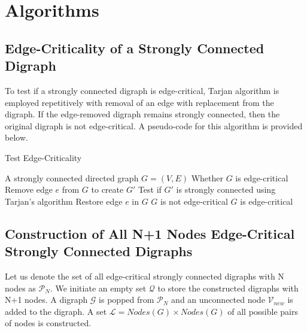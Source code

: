 \documentclass[runningheads]{llncs}
\begin{document}
\section{Algorithms}

\subsection{Edge-Criticality of a Strongly Connected Digraph}
 To test if a strongly connected digraph is edge-critical, Tarjan algorithm is employed repetitively with removal of an edge with replacement from the digraph. If the edge-removed digraph remains strongly connected, then the original digraph is not edge-critical. A pseudo-code for this algorithm is provided below.

\begin{algorithm}
\caption{Test Edge-Criticality}
\label{alg:edge_criticality}
\begin{algorithmic}[1]
\REQUIRE A strongly connected directed graph $G = (V, E)$
\ENSURE Whether $G$ is edge-critical
    \STATE Remove edge $e$ from $G$ to create $G'$
    \STATE Test if $G'$ is strongly connected using Tarjan's algorithm
        \STATE Restore edge $e$ in $G$
    \ELSE
        \RETURN $G$ is not edge-critical
    \ENDIF
\ENDFOR
\RETURN $G$ is edge-critical
\end{algorithmic}
\end{algorithm}

\subsection{Construction of All N+1 Nodes Edge-Critical Strongly Connected Digraphs}
Let us denote the set of all edge-critical strongly connected digraphs with N nodes as $\mathcal{P}_N$. We initiate an empty set $\mathcal{Q}$ to store the constructed digraphs with N+1 nodes. A digraph $\mathcal{G}$ is popped from $\mathcal{P}_N$ and an unconnected node $\mathcal{V}_{new}$ is added to the digraph. A set $\mathcal{L = }Nodes({G}) {\times} Nodes ({G})$ of all possible pairs of nodes is constructed. 
\end{document}
